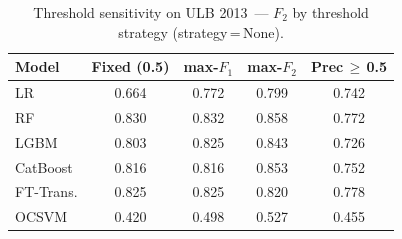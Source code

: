 \begin{table}[H]
\centering
\caption{Threshold sensitivity on ULB 2013~--- $F_2$ by threshold strategy (strategy\,=\,None).}
\label{tab:threshold_ulb_f2}
\begin{tabular}{l c c c c}
\toprule
Model & Fixed (0.5) & max-$F_1$ & max-$F_2$ & Prec\,$\geq$\,0.5 \\
\midrule
LR         & 0.664 & 0.772 & 0.799 & 0.742 \\
RF         & 0.830 & 0.832 & 0.858 & 0.772 \\
LGBM       & 0.803 & 0.825 & 0.843 & 0.726 \\
CatBoost   & 0.816 & 0.816 & 0.853 & 0.752 \\
FT-Trans.  & 0.825 & 0.825 & 0.820 & 0.778 \\
OCSVM      & 0.420 & 0.498 & 0.527 & 0.455 \\
\bottomrule
\end{tabular}
\end{table}